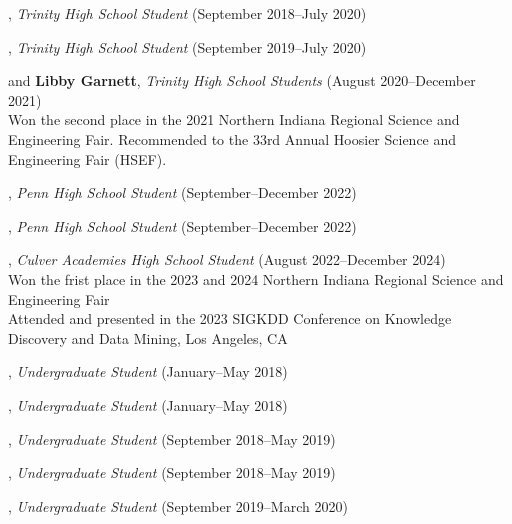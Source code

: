 \documentclass[10pt]{article}
\newenvironment{myindentpar}[1]%
{\begin{list}{}%
         {\setlength{\leftmargin}{#1}}%
         \item[]%
}
{\end{list}}
\newcounter{list}
\begin{document}
\begin{myindentpar}{0.75cm}

\hspace{-0.75cm}{\bf Eric Zhang}, \textit{Trinity High School Student} (September 2018--July 2020)

\hspace{-0.75cm}{\bf Michael Florin}, \textit{Trinity High School Student} (September 2019--July 2020)

\hspace{-0.75cm}{\bf Rebekah Fang} and {\bf Libby Garnett}, \textit{Trinity High School Students} (August 2020--December 2021) \\
	Won the second place in the 2021 Northern Indiana Regional Science and Engineering Fair. Recommended to the 33rd Annual Hoosier Science and Engineering Fair (HSEF).

\hspace{-0.75cm}{\bf Ishita Masetty}, \textit{Penn High School Student} (September--December 2022)

\hspace{-0.75cm}{\bf Jake Ciliberti}, \textit{Penn High School Student} (September--December 2022)

\hspace{-0.75cm}{\bf Albert Lu}, \textit{Culver Academies High School Student} (August 2022--December 2024) \\
	{Won the frist place in the 2023 and 2024 Northern Indiana Regional Science and Engineering Fair} \\
	{Attended and presented in the 2023 SIGKDD Conference on Knowledge Discovery and Data Mining, Los Angeles, CA}

\hspace{-0.75cm}{\bf Matthew Malir}, \textit{Undergraduate Student} (January--May 2018)
	
\hspace{-0.75cm}{\bf Sebastian Miner}, \textit{Undergraduate Student} (January--May 2018)

\hspace{-0.75cm}{\bf Matthew Schoenbauer}, \textit{Undergraduate Student} (September 2018--May 2019)
	
\hspace{-0.75cm}{\bf Yuhan (Tina) Wu}, \textit{Undergraduate Student} (September 2018--May 2019)

\hspace{-0.75cm}{\bf Chan Hee Song}, \textit{Undergraduate Student} (September 2019--March 2020)


\end{myindentpar}
\end{document}
